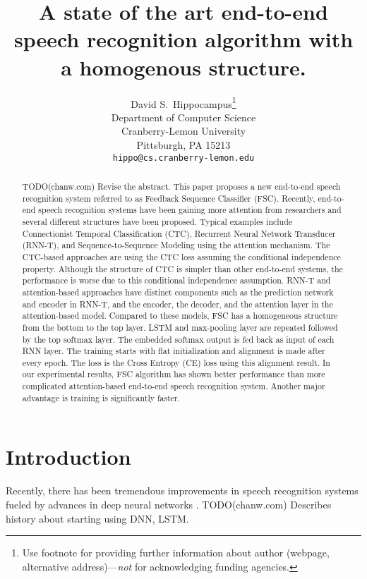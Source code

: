 \documentclass{article}
\title{A state of the art end-to-end speech recognition algorithm with
a homogenous structure.}
\author{
  David S.~Hippocampus\thanks{Use footnote for providing further
    information about author (webpage, alternative
    address)---\emph{not} for acknowledging funding agencies.} \\
  Department of Computer Science\\
  Cranberry-Lemon University\\
  Pittsburgh, PA 15213 \\
  \texttt{hippo@cs.cranberry-lemon.edu} \\
}
\begin{document}

\maketitle

\begin{abstract}
TODO(chanw.com) Revise the abstract.
This paper proposes a new end-to-end speech recognition system referred to
as Feedback Sequence Classifier (FSC). Recently, end-to-end speech
recognition systems have been gaining more attention from researchers and
several different structures have been proposed. Typical examples  
include Connectionist Temporal Classification (CTC), Recurrent Neural Network
  Transducer (RNN-T), and Sequence-to-Sequence Modeling using the attention
mechanism. The CTC-based approaches are using the CTC loss assuming the
conditional independence property. Although the structure of CTC is simpler
than other end-to-end systems, the performance is worse due to this conditional
independence assumption. RNN-T and attention-based approaches have distinct
components such as the prediction network  and encoder in RNN-T, and
the encoder, the decoder, and the attention layer in the attention-based model.
Compared to these models, FSC has a homogeneous structure from the bottom to 
the top layer. LSTM and max-pooling layer are repeated followed by the top
softmax layer. The embedded softmax output is fed back as input of each RNN
layer. The training starts with flat initialization and alignment is made
after every epoch. The loss is the Cross Entropy (CE) loss using this 
alignment result. In our experimental results, FSC algorithm has shown 
better performance than more complicated attention-based end-to-end speech
recognition system. Another major advantage is training is significantly
faster.
\end{abstract}

\section{Introduction}
Recently, there has been tremendous improvements in speech recognition
systems fueled by advances in deep neural networks
\cite{
  Yu2013FeatureLearningDNN, 
  g_hinton_ieee_signal_processing_mag_2012,
  Seltzer2013DNNAurora4, 
  t_sainath_taslp_2017_00,
  t_sainath_book_chapter_2017_00,
  v_vanhoucke_nips_workshop_2011_00}.
TODO(chanw.com) Describes history about starting using DNN, LSTM.
\end{document}
